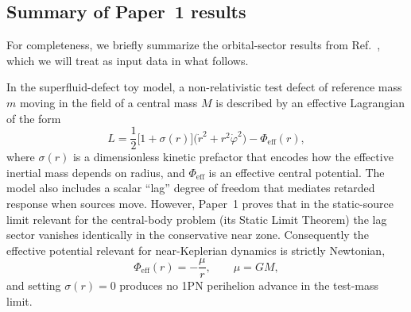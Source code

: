 \documentclass[11pt]{article}
\begin{document}
\subsection{Summary of Paper~1 results}
\label{subsec:intro-paper1-summary}

For completeness, we briefly summarize the orbital-sector results from
Ref.~\cite{Norris:2025Orbits}, which we will treat as input data in what follows.

In the superfluid-defect toy model, a non-relativistic test defect of reference
mass $m$ moving in the field of a central mass $M$ is described by an effective
Lagrangian of the form
\begin{equation}
  L
  = \frac{1}{2}\bigl[1 + \sigma(r)\bigr]
      \bigl(\dot r^2 + r^2 \dot\varphi^2\bigr)
    - \Phi_{\mathrm{eff}}(r),
\end{equation}
where $\sigma(r)$ is a dimensionless kinetic prefactor that encodes how the
effective inertial mass depends on radius, and $\Phi_{\mathrm{eff}}$ is an
effective central potential.
The model also includes a scalar ``lag'' degree of freedom that mediates
retarded response when sources move.  However, Paper~1 proves that in the
static-source limit relevant for the central-body problem (its Static Limit
Theorem) the lag sector vanishes identically in the conservative near zone.
Consequently the effective potential relevant for near-Keplerian dynamics is
strictly Newtonian,
\begin{equation}
  \Phi_{\mathrm{eff}}(r)
  = -\frac{\mu}{r},
  \qquad
  \mu = GM,
\end{equation}
and setting $\sigma(r)=0$ produces no 1PN perihelion advance in the test-mass
limit.
\end{document}
